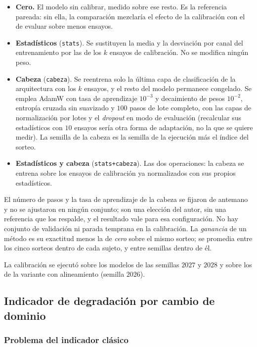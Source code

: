 \begin{itemize}
  \item \textbf{Cero.} El modelo \loso{} sin calibrar, medido sobre ese resto. Es la
  referencia pareada: sin ella, la comparación mezclaría el efecto de la calibración con el
  de evaluar sobre menos ensayos.
  \item \textbf{Estadísticos} (\texttt{stats}). Se sustituyen la media y la desviación por canal del
  entrenamiento por las de los $k$ ensayos de calibración. No se modifica ningún peso.
  \item \textbf{Cabeza} (\texttt{cabeza}). Se reentrena solo la última capa de clasificación de la
  arquitectura con los $k$ ensayos, y el resto del modelo permanece congelado. Se emplea
  AdamW con tasa de aprendizaje $10^{-3}$ y decaimiento de pesos $10^{-2}$, entropía cruzada
  sin suavizado y $100$ pasos de lote completo, con las capas de normalización por lotes y
  el \textit{dropout} en modo de evaluación (recalcular sus estadísticos con $10$ ensayos
  sería otra forma de adaptación, no la que se quiere medir). La semilla de la cabeza es la
  semilla de la ejecución más el índice del sorteo.
  \item \textbf{Estadísticos y cabeza} (\texttt{stats+cabeza}). Las dos operaciones: la cabeza se entrena sobre los
  ensayos de calibración ya normalizados con sus propios estadísticos.
\end{itemize}

El número de pasos y la tasa de aprendizaje de la cabeza se fijaron de antemano y no se
ajustaron en ningún conjunto; son una elección del autor, sin una referencia que los respalde, y el
resultado vale para esa configuración. No hay conjunto de validación ni parada temprana en la
calibración. La \emph{ganancia} de un método es su exactitud menos la de \emph{cero} sobre
el mismo sorteo; se promedia entre los cinco sorteos dentro de cada sujeto, y entre
semillas dentro de él.

La calibración se ejecutó sobre los modelos \loso{} de las semillas $2027$ y $2028$ y sobre
los de la variante con alineamiento (semilla $2026$).


\subsection{Indicador de degradación por cambio de dominio}
\label{sec:dsi}

\subsubsection{Problema del indicador clásico}

